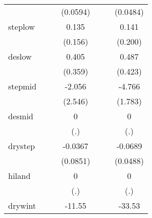 {\begin{tabular}{l*{6}{c}}
            &                     &                     &    (0.0594)         &                     &                     &    (0.0484)         \\
[1em]
steplow     &                     &                     &       0.135         &                     &                     &       0.141         \\
            &                     &                     &     (0.156)         &                     &                     &     (0.200)         \\
[1em]
deslow      &                     &                     &       0.405         &                     &                     &       0.487         \\
            &                     &                     &     (0.359)         &                     &                     &     (0.423)         \\
[1em]
stepmid     &                     &                     &      -2.056         &                     &                     &      -4.766\sym{*}  \\
            &                     &                     &     (2.546)         &                     &                     &     (1.783)         \\
[1em]
desmid      &                     &                     &           0         &                     &                     &           0         \\
            &                     &                     &         (.)         &                     &                     &         (.)         \\
[1em]
drystep     &                     &                     &     -0.0367         &                     &                     &     -0.0689         \\
            &                     &                     &    (0.0851)         &                     &                     &    (0.0488)         \\
[1em]
hiland      &                     &                     &           0         &                     &                     &           0         \\
            &                     &                     &         (.)         &                     &                     &         (.)         \\
[1em]
drywint     &                     &                     &      -11.55         &                     &                     &      -33.53         \\

\end{tabular}}
